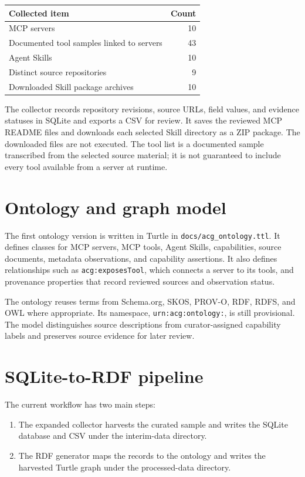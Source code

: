 \documentclass[11pt,a4paper]{article}
\begin{document}
\begin{center}
\begin{tabular}{@{}lr@{}}
\toprule
\textbf{Collected item} & \textbf{Count}\\
\midrule
MCP servers & 10\\
Documented tool samples linked to servers & 43\\
Agent Skills & 10\\
Distinct source repositories & 9\\
Downloaded Skill package archives & 10\\
\bottomrule
\end{tabular}
\end{center}

The collector records repository revisions, source URLs, field values, and
evidence statuses in SQLite and exports a CSV for review. It saves the reviewed
MCP README files and downloads each selected Skill directory as a ZIP package.
The downloaded files are not executed. The tool list is a documented sample
transcribed from the selected source material; it is not guaranteed to include
every tool available from a server at runtime.

\section{Ontology and graph model}

The first ontology version is written in Turtle in
\texttt{docs/acg\_ontology.ttl}. It defines classes for MCP servers, MCP tools,
Agent Skills, capabilities, source documents, metadata observations, and
capability assertions. It also defines relationships such as
\texttt{acg:exposesTool}, which connects a server to its tools, and provenance
properties that record reviewed sources and observation status.

The ontology reuses terms from Schema.org, SKOS, PROV-O, RDF, RDFS, and OWL where
appropriate. Its namespace, \texttt{urn:acg:ontology:}, is still provisional.
The model distinguishes source descriptions from curator-assigned capability
labels and preserves source evidence for later review.

\section{SQLite-to-RDF pipeline}

The current workflow has two main steps:

\begin{enumerate}
  \item The expanded collector harvests the curated sample and writes the
  SQLite database and CSV under the interim-data directory.
  \item The RDF generator maps the records to the ontology and writes the
  harvested Turtle graph under the processed-data directory.
\end{enumerate}
\end{document}
